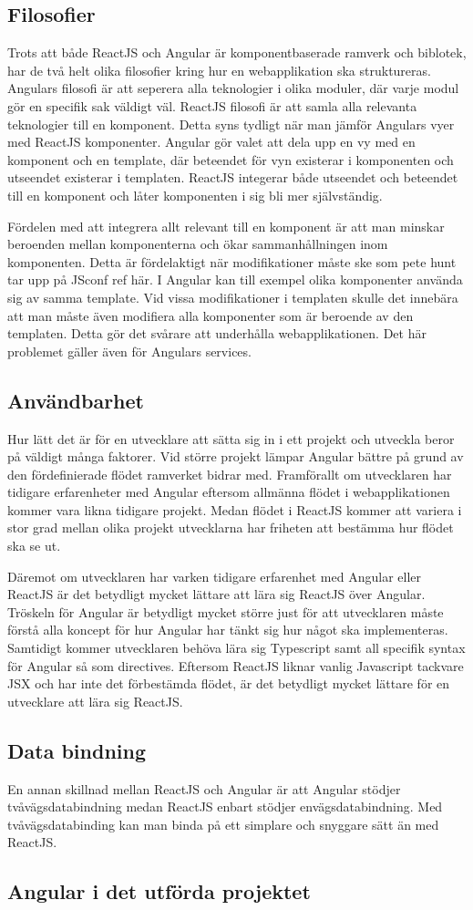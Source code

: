 \subsection{Filosofier}
Trots att både ReactJS och Angular är komponentbaserade ramverk och biblotek, har de två helt olika filosofier kring hur en webapplikation ska struktureras. Angulars filosofi är att seperera alla teknologier i olika moduler, där varje modul gör en specifik sak väldigt väl. ReactJS filosofi är att samla alla relevanta teknologier till en komponent. Detta syns tydligt när man jämför Angulars vyer med ReactJS komponenter. Angular gör valet att dela upp en vy med en komponent och en template, där beteendet för vyn existerar i komponenten och utseendet existerar i templaten. ReactJS integerar både utseendet och beteendet till en komponent och låter komponenten i sig bli mer självständig. 

Fördelen med att integrera allt relevant till en komponent är att man minskar beroenden mellan komponenterna och ökar sammanhållningen inom komponenten. Detta är fördelaktigt när modifikationer måste ske som pete hunt tar upp på JSconf ref här. I Angular kan till exempel olika komponenter använda sig av samma template. Vid vissa modifikationer i templaten skulle det innebära att man måste även modifiera alla komponenter som är beroende av den templaten. Detta gör det svårare att underhålla webapplikationen. Det här problemet gäller även för Angulars services.


\subsection{Användbarhet}
Hur lätt det är för en utvecklare att sätta sig in i ett projekt och utveckla beror på väldigt många faktorer. Vid större projekt lämpar Angular bättre på grund av den fördefinierade flödet ramverket bidrar med. Framförallt om utvecklaren har tidigare erfarenheter med Angular eftersom allmänna flödet i webapplikationen kommer vara likna tidigare projekt. Medan flödet i ReactJS kommer att variera i stor grad mellan olika projekt utvecklarna har friheten att bestämma hur flödet ska se ut. 

Däremot om utvecklaren har varken tidigare erfarenhet med Angular eller ReactJS är det betydligt mycket lättare att lära sig ReactJS över Angular. Tröskeln för Angular är betydligt mycket större just för att utvecklaren måste förstå alla koncept för hur Angular har tänkt sig hur något ska implementeras. Samtidigt kommer utvecklaren behöva lära sig Typescript samt all specifik syntax för Angular så som directives. Eftersom ReactJS liknar vanlig Javascript tackvare JSX och har inte det förbestämda flödet, är det betydligt mycket lättare för en utvecklare att lära sig ReactJS.

\subsection{Data bindning}
En annan skillnad mellan ReactJS och Angular är att Angular stödjer tvåvägsdatabindning medan ReactJS enbart stödjer envägsdatabindning. Med tvåvägsdatabinding kan man binda på ett simplare och snyggare sätt än med ReactJS.

\subsection{Angular i det utförda projektet}
 
